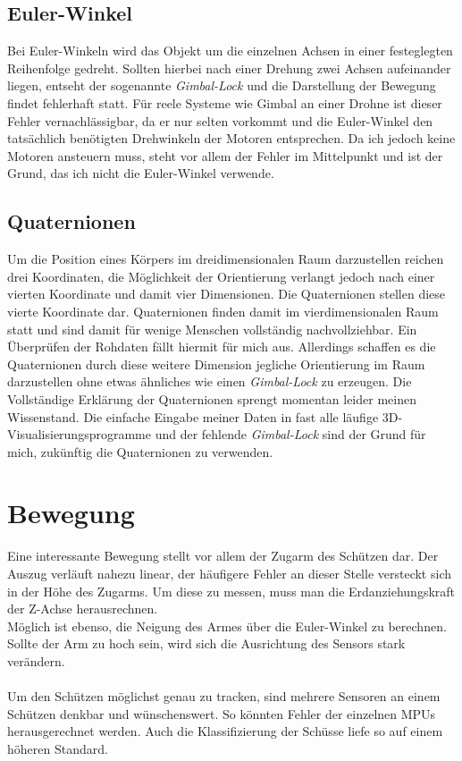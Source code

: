 \subsection{Euler-Winkel}
Bei Euler-Winkeln wird das Objekt um die einzelnen Achsen in einer festeglegten Reihenfolge gedreht. Sollten hierbei 
nach einer Drehung zwei Achsen aufeinander liegen, entseht der sogenannte \textit{Gimbal-Lock} und die Darstellung
der Bewegung findet fehlerhaft statt. Für reele Systeme wie Gimbal an einer Drohne ist dieser Fehler vernachlässigbar,
da er nur selten vorkommt und die Euler-Winkel den tatsächlich benötigten Drehwinkeln der Motoren entsprechen.
Da ich jedoch keine Motoren ansteuern muss, steht vor allem der Fehler im Mittelpunkt und ist der Grund, das ich nicht
die Euler-Winkel verwende.  

\subsection{Quaternionen}
Um die Position eines Körpers im dreidimensionalen Raum darzustellen reichen drei Koordinaten, 
die Möglichkeit der Orientierung verlangt jedoch nach einer vierten Koordinate und damit vier Dimensionen. 
Die Quaternionen stellen diese vierte Koordinate dar. Quaternionen finden damit im vierdimensionalen Raum statt
und sind damit für wenige Menschen vollständig nachvollziehbar. Ein Überprüfen der Rohdaten fällt hiermit für mich aus.
Allerdings schaffen es die Quaternionen durch diese weitere Dimension jegliche Orientierung im Raum darzustellen ohne
etwas ähnliches wie einen \textit{Gimbal-Lock} zu erzeugen. Die Vollständige Erklärung der Quaternionen sprengt momentan
leider meinen Wissenstand. Die einfache Eingabe meiner Daten in fast alle läufige 3D-Visualisierungsprogramme und 
der fehlende \textit{Gimbal-Lock} sind der Grund für mich, zukünftig die Quaternionen zu verwenden.

\section {Bewegung}
Eine interessante Bewegung stellt vor allem der Zugarm des 
Schützen dar. Der Auszug verläuft nahezu linear, der häufigere Fehler 
an dieser Stelle versteckt sich in der Höhe des Zugarms. 
Um diese zu messen, muss man die Erdanziehungskraft der Z-Achse herausrechnen.\\
Möglich ist ebenso, die Neigung des Armes über die Euler-Winkel zu berechnen. Sollte 
der Arm zu hoch sein, wird sich die Ausrichtung des Sensors stark verändern.\\
\\
Um den Schützen möglichst genau zu tracken, sind mehrere Sensoren an einem Schützen denkbar und
wünschenswert. So könnten Fehler der einzelnen MPUs herausgerechnet werden.
Auch die Klassifizierung der Schüsse liefe so auf einem höheren Standard.